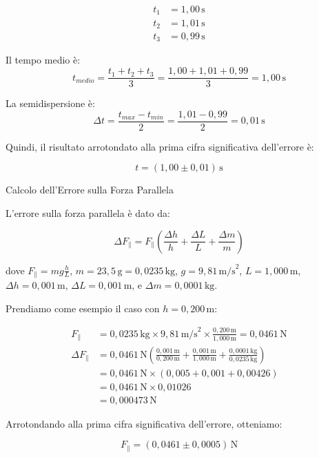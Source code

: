 \documentclass[12pt,a4paper,oneside]{book}
\makeatletter
\renewcommand{\subsubsection}{\@startsection {subsubsection}{3}{\z@}
{-2ex \@plus -0.1ex \@minus -.2ex}
{.2ex \@plus.2ex }
{\color[rgb]{0.141,0.596,0.749}\normalfont\small\sffamily\bfseries}}
\theoremstyle{esercizio}
\makeatother
\begin{document}
\begin{align*}
t_1 &= 1,00 \, \text{s} \\
t_2 &= 1,01 \, \text{s} \\
t_3 &= 0,99 \, \text{s}
\end{align*}

Il tempo medio è:
\[ t_{medio} = \frac{t_1 + t_2 + t_3}{3} = \frac{1,00 + 1,01 + 0,99}{3} = 1,00 \, \text{s} \]

La semidispersione è:
\[ \Delta t = \frac{t_{max} - t_{min}}{2} = \frac{1,01 - 0,99}{2} = 0,01 \, \text{s} \]

Quindi, il risultato arrotondato alla prima cifra significativa dell'errore è:

\[ t = (1,00 \pm 0,01) \, \text{s} \]

\subsubsection{Calcolo dell'Errore sulla Forza Parallela}

L'errore sulla forza parallela è dato da:

\[ \Delta F_\parallel = F_\parallel \left( \frac{\Delta h}{h} + \frac{\Delta L}{L} + \frac{\Delta m}{m} \right) \]

dove $F_\parallel = m g \frac{h}{L}$, $m = 23,5 \, \text{g} = 0,0235 \, \text{kg}$, $g = 9,81 \, \text{m/s}^2$, $L = 1,000 \, \text{m}$, $\Delta h = 0,001 \, \text{m}$, $\Delta L = 0,001 \, \text{m}$, e $\Delta m = 0,0001 \, \text{kg}$.

Prendiamo come esempio il caso con $h = 0,200 \, \text{m}$:

\begin{align*}
F_\parallel &= 0,0235 \, \text{kg} \times 9,81 \, \text{m/s}^2 \times \frac{0,200 \, \text{m}}{1,000 \, \text{m}} = 0,0461 \, \text{N} \\[10pt]
\Delta F_\parallel &= 0,0461 \, \text{N} \left( \frac{0,001 \, \text{m}}{0,200 \, \text{m}} + \frac{0,001 \, \text{m}}{1,000 \, \text{m}} + \frac{0,0001 \, \text{kg}}{0,0235 \, \text{kg}} \right) \\[10pt]
&= 0,0461 \, \text{N} \times (0,005 + 0,001 + 0,00426) \\[10pt]
&= 0,0461 \, \text{N} \times 0,01026 \\[10pt]
&= 0,000473 \, \text{N}
\end{align*}

Arrotondando alla prima cifra significativa dell'errore, otteniamo:

\[ F_\parallel = (0,0461 \pm 0,0005) \, \text{N} \]
\end{document}
